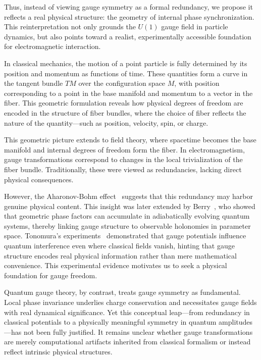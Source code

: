 \documentclass[%
 reprint,
 amsmath,amssymb,
 aps,
]{revtex4-1}
\numberwithin{equation}{section}%
\begin{document}
Thus, instead of viewing gauge symmetry as a formal redundancy, we propose it reflects a real physical structure: the geometry of internal phase synchronization. This reinterpretation not only grounds the $U(1)$ gauge field in particle dynamics, but also points toward a realist, experimentally accessible foundation for electromagnetic interaction.

In classical mechanics, the motion of a point particle is fully determined by its position and momentum as functions of time. These quantities form a curve in the tangent bundle $TM$ over the configuration space  $M$, with position corresponding to a point in the base manifold and momentum to a vector in the fiber. This geometric formulation reveals how physical degrees of freedom are encoded in the structure of fiber bundles, where the choice of fiber reflects the nature of the quantity—such as position, velocity, spin, or charge.

This geometric picture extends to field theory, where spacetime becomes the base manifold and internal degrees of freedom form the fiber. In electromagnetism, gauge transformations correspond to changes in the local trivialization of the fiber bundle. Traditionally, these were viewed as redundancies, lacking direct physical consequences.

However, the Aharonov-Bohm effect~\cite{aharonov1959} suggests that this redundancy may harbor genuine physical content. This insight was later extended by Berry~\cite{berry1984}, who showed that geometric phase factors can accumulate in adiabatically evolving quantum systems, thereby linking gauge structure to observable holonomies in parameter space. Tonomura's experiments~\cite{tonomura1986} demonstrated that gauge potentials influence quantum interference even where classical fields vanish, hinting that gauge structure encodes real physical information rather than mere mathematical convenience. This experimental evidence motivates us to seek a physical foundation for gauge freedom.

Quantum gauge theory, by contrast, treats gauge symmetry as fundamental. Local phase invariance underlies charge conservation and necessitates gauge fields with real dynamical significance. Yet this conceptual leap—from redundancy in classical potentials to a physically meaningful symmetry in quantum amplitudes---has not been fully justified. It remains unclear whether gauge transformations are merely computational artifacts inherited from classical formalism or instead reflect intrinsic physical structures.
\end{document}

